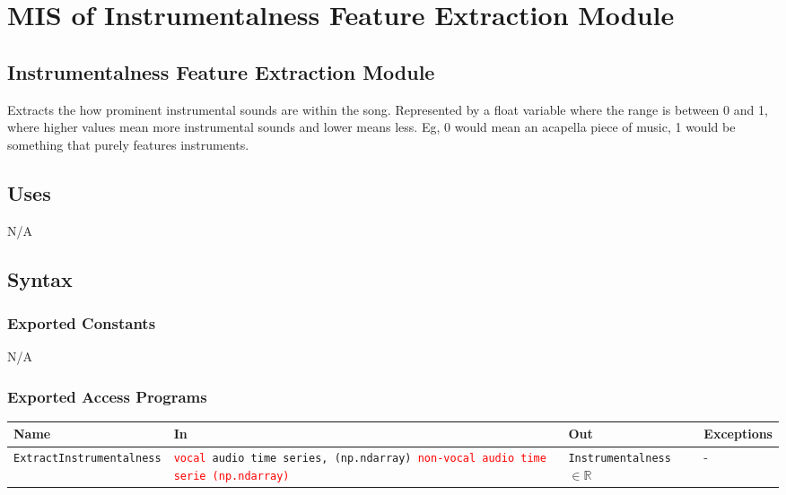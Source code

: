 \documentclass[12pt, titlepage]{article}
\begin{document}
\section{MIS of Instrumentalness Feature Extraction Module} 

\subsection{Instrumentalness Feature Extraction Module}
Extracts the how prominent instrumental sounds are within the song. Represented by a float
variable where the range is between 0 and 1, where higher values mean more instrumental sounds
and lower means less. Eg, 0 would mean an acapella piece of music, 1 would be something that purely
features instruments.  

\subsection{Uses}
N/A

\subsection{Syntax}

\subsubsection{Exported Constants}
N/A

\subsubsection{Exported Access Programs}

\begin{center}
\begin{tabular}{p{4cm} p{4cm} p{4cm} p{2cm}}
\hline
\textbf{Name} & \textbf{In} & \textbf{Out} & \textbf{Exceptions}\\
\hline%
\texttt{Extract\linebreak Instrumentalness} &\texttt{\textcolor{red}{vocal} audio time series, \linebreak (np.ndarray) \linebreak \textcolor{red}{non-vocal audio time serie \linebreak (np.ndarray)}} &\texttt{Instrumentalness} $\in \mathbb{R}$ &-\\
\hline
\end{tabular}
\end{center}
\end{document}
